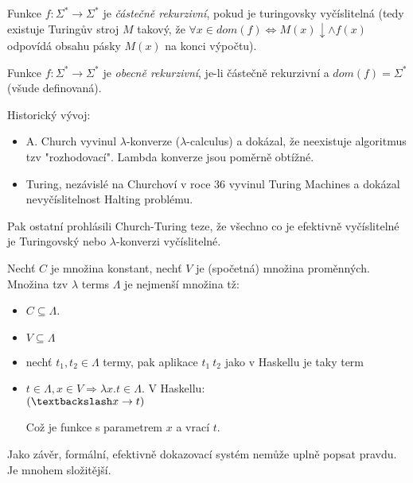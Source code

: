 \begin{definition}
    Funkce $f: \Sigma^*\rightarrow\Sigma^*$ je \emph{částečně rekurzivní}, pokud je turingovsky vyčíslitelná (tedy existuje Turingův stroj $M$ takový, že $\forall x \in dom(f)\Leftrightarrow M(x)\downarrow \land f(x)$ odpovídá obsahu pásky $M(x)$ na konci výpočtu).

    Funkce $f: \Sigma^*\to \Sigma^*$ je \emph{obecně rekurzivní}, je-li částečně rekurzivní a $dom(f)=\Sigma^*$ (všude definovaná).
\end{definition}

\begin{note}
	Historický vývoj:
	\begin{itemize}
		\item A. Church vyvinul $\lambda$-konverze ($\lambda$-calculus) a dokázal, že neexistuje algoritmus tzv "rozhodovací".
		Lambda konverze jsou poměrně obtížné.
		\item Turing, nezávislé na Churchoví v roce 36 vyvinul Turing Machines a dokázal nevyčíslitelnost Halting problému.
	\end{itemize}

	Pak ostatní prohlásili Church-Turing teze, že všechno co je efektivně vyčíslitelné je Turingovský nebo $\lambda$-konverzi vyčíslitelné.
\end{note}

\begin{definition}
	Nechť $C$ je množina konstant, nechť $V$ je (spočetná) množina proměnných.
	Množina tzv $\lambda$ terms $\Lambda$ je nejmenší množina tž:
	\begin{itemize}
		\item $C \subseteq \Lambda$.
		\item $V \subseteq \Lambda$
		\item nechť $t_1, t_2 \in \Lambda$ termy, pak aplikace $t_1\ t_2$ jako v Haskellu je taky term
		\item $t \in \Lambda, x \in V \Rightarrow \lambda x . t \in \Lambda$.
			V Haskellu:\\ $(\textbackslash x \to t)$

			Což je funkce s parametrem $x$ a vrací $t$.
	\end{itemize}
\end{definition}

Jako závěr, formální, efektivně dokazovací systém nemůže uplně popsat pravdu. Je mnohem složitější.

